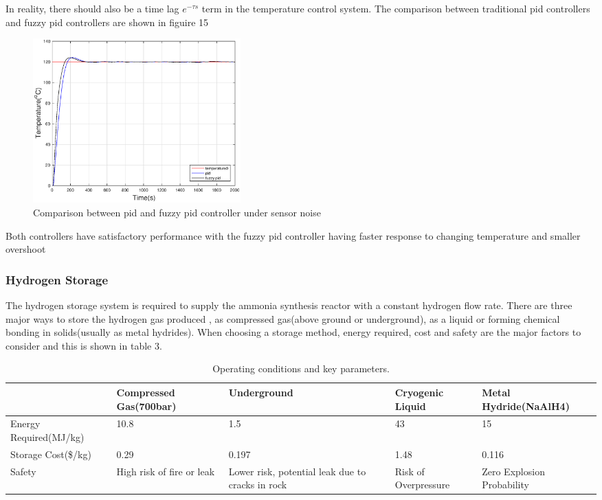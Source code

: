 In reality, there should also be a time lag $e^{-\tau s}$ term in the temperature control system. 
The comparison between traditional pid controllers and fuzzy pid controllers are shown in figuire 15
\begin{figure}[H]
\centering
\includegraphics[width = 8cm]{pidpid.eps}
\caption{Comparison between pid and fuzzy pid controller under sensor noise}
\end{figure}
Both controllers have satisfactory performance with the fuzzy pid controller having faster response to changing temperature and smaller overshoot 



\subsubsection{Hydrogen  Storage }
The hydrogen storage system is required to supply the ammonia synthesis reactor with a constant hydrogen flow rate. There are three major ways to store the hydrogen gas produced , as compressed gas(above ground or underground), as a liquid or forming chemical bonding in solids(usually as metal hydrides).
When choosing a storage method, energy required, cost and safety are the major factors to consider and this is shown in table 3.
\begin{singlespace}
\begin{table}[H]
\begin{tabular}{ |p{4.2cm}|p{2.2cm}|p{2.5cm}|p{3.2cm}| p{2.7cm}|} 
 \hline
  & Compressed Gas(700bar) & Underground & Cryogenic Liquid   & Metal Hydride(NaAlH4) \\ 
 \hline
 Energy Required(MJ/kg) & 10.8  & 1.5  &43    & 15\\ 
 \hline
Storage Cost(\$/kg) & 0.29  & 0.197  &1.48 & 0.116\\ 
 \hline
 Safety & High risk of fire or leak & Lower risk, potential leak due to cracks in rock & Risk of Overpressure & Zero Explosion Probability \\
 \hline
\end{tabular}
\caption{\label{tab:table-name}Operating conditions and key parameters.\cite{storage2}\cite{storage}\cite{gas2}\cite{gas3}}
\end{table}
\end{singlespace}


